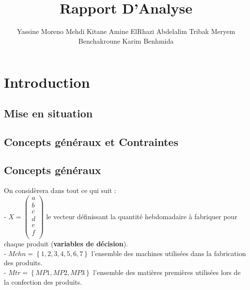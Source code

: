 \documentclass[a4paper, 11pt]{article}
\title{Rapport D'Analyse}
\author{Yassine Moreno \cr Mehdi Kitane \cr Amine ElRhazi \cr Abdelalim Tribak \cr Meryem Benchakroune \cr Karim Benhmida}
\begin{document}
\begin{LARGE}
\maketitle
\end{LARGE}

\tableofcontents
\newpage

\section{Introduction}
\subsection{Mise en situation}
\subsection{Concepts généraux et Contraintes}
\subsection*{Concepts généraux}
On considèrera dans tout ce qui suit : \\
- $X = \begin{pmatrix}
        a\\
        b\\
        c\\
        d\\
        e\\
        f\\
    \end{pmatrix}$ le vecteur définissant la quantité hebdomadaire à fabriquer pour chaque produit (\textbf{variables de décision}).\\
- $Mchn = \left\{1, 2, 3, 4, 5, 6, 7\right\}$ l'ensemble des machines utilisées dans la fabrication des produits.\\
- $Mtr = \left\{MP1,MP2,MP3\right\}$ l'ensemble des matières premières utilisées lors de la confection des produits.\\
\end{document}
